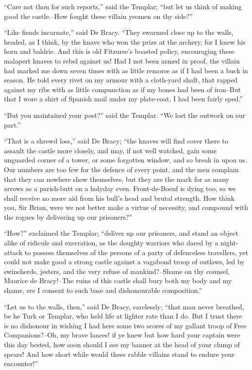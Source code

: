 ``Care not thou for such reports,'' said the Templar; ``but let us think
of making good the castle.--How fought these villain yeomen on thy
side?''

``Like fiends incarnate,'' said De Bracy. ``They swarmed close up to the
walls, headed, as I think, by the knave who won the prize at the
archery, for I knew his horn and baldric. And this is old Fitzurse's
boasted policy, encouraging these malapert knaves to rebel against us!
Had I not been armed in proof, the villain had marked me down seven
times with as little remorse as if I had been a buck in season. He told
every rivet on my armour with a cloth-yard shaft, that rapped against my
ribs with as little compunction as if my bones had been of iron--But
that I wore a shirt of Spanish mail under my plate-coat, I had been
fairly sped.''

``But you maintained your post?'' said the Templar. ``We lost the
outwork on our part.''

``That is a shrewd loss,'' said De Bracy; ``the knaves will find cover
there to assault the castle more closely, and may, if not well watched,
gain some unguarded corner of a tower, or some forgotten window, and so
break in upon us. Our numbers are too few for the defence of every
point, and the men complain that they can nowhere show themselves, but
they are the mark for as many arrows as a parish-butt on a holyday even.
Front-de-Boeuf is dying too, so we shall receive no more aid from his
bull's head and brutal strength. How think you, Sir Brian, were we not
better make a virtue of necessity, and compound with the rogues by
delivering up our prisoners?''

``How?'' exclaimed the Templar; ``deliver up our prisoners, and stand an
object alike of ridicule and execration, as the doughty warriors who
dared by a night-attack to possess themselves of the persons of a party
of defenceless travellers, yet could not make good a strong castle
against a vagabond troop of outlaws, led by swineherds, jesters, and the
very refuse of mankind?--Shame on thy counsel, Maurice de Bracy!--The
ruins of this castle shall bury both my body and my shame, ere I consent
to such base and dishonourable composition.''

``Let us to the walls, then,'' said De Bracy, carelessly; ``that man
never breathed, be he Turk or Templar, who held life at lighter rate
than I do. But I trust there is no dishonour in wishing I had here some
two scores of my gallant troop of Free Companions?--Oh, my brave lances!
if ye knew but how hard your captain were this day bested, how soon
should I see my banner at the head of your clump of spears! And how
short while would these rabble villains stand to endure your
encounter!''

